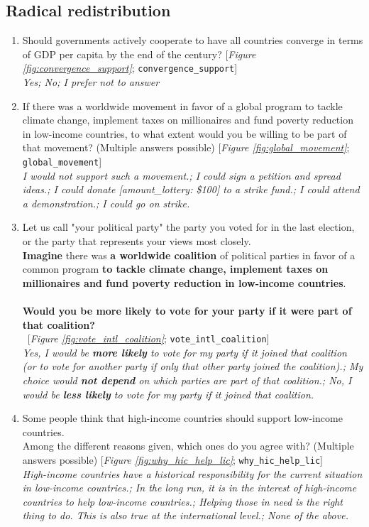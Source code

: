  \subsection*{Radical redistribution} 
 \begin{enumerate}[resume] 
\item  \label{q:convergence_support} Should governments actively cooperate to have all countries converge in terms of GDP per capita by the end of the century? [\textit{Figure \ref{fig:convergence_support}}; 
\verb|convergence_support|]
  \\ \textit{Yes; No; I prefer not to answer}

\item  \label{q:global_movement} If there was a worldwide movement in favor of a global program to tackle climate change, implement taxes on millionaires and fund poverty reduction in low-income countries, to what extent would you be willing to be part of that movement? (Multiple answers possible) [\textit{Figure \ref{fig:global_movement}}; 
\verb|global_movement|]
  \\ \textit{I would \textit{not} support such a movement.; I could sign a petition and spread ideas.; I could donate [amount\_lottery: \$100] to a strike fund.; I could attend a demonstration.; I could go on strike.}

\item  \label{q:vote_intl_coalition} Let us call "your political party" the party you voted for in the last election, or the party that represents your views most closely.~\\\textbf{Imagine }there was \textbf{a worldwide coalition} of political parties in favor of a common program \textbf{to tackle climate change, implement taxes on millionaires and fund poverty reduction in low-income countries}.~\\\\\textbf{Would you be more likely to vote for your party if it were part of that coalition?}\\ 
~[\textit{Figure \ref{fig:vote_intl_coalition}}; 
\verb|vote_intl_coalition|]
  \\ \textit{Yes, I would be \textbf{more likely} to vote for my party if it joined that coalition (or to vote for another party if only that other party joined the coalition).; My choice would \textbf{not depend} on which parties are part of that coalition.; No, I would be \textbf{less likely} to vote for my party if it joined that coalition.}

\item  \label{q:why_hic_help_lic} Some people think that high-income countries should support low-income countries.~\\Among the different reasons given, which ones do you agree with? (Multiple answers possible) [\textit{Figure \ref{fig:why_hic_help_lic}}; 
\verb|why_hic_help_lic|]
  \\ \textit{High-income countries have a historical responsibility for the current situation in low-income countries.; In the long run, it is in the interest of high-income countries to help low-income countries.; Helping those in need is the right thing to do. This is also true at the international level.; None of the above.}


\end{enumerate}
